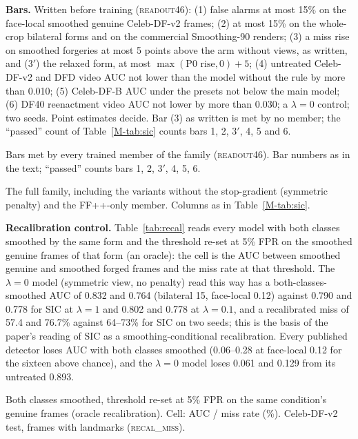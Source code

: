 \documentclass[10pt]{article}
\begin{document}
\textbf{Bars.} Written before training (\textsc{readout46}): (1) false alarms at most 15\% on the
face-local smoothed genuine Celeb-DF-v2 frames; (2) at most 15\% on the whole-crop bilateral forms and on the commercial
Smoothing-90 renders; (3) a miss rise on smoothed forgeries at most 5 points above the arm without views, as written, and
(3$'$) the relaxed form, at most $\max(\text{P0 rise},0)+5$; (4) untreated Celeb-DF-v2 and DFD video AUC not lower than the
model without the rule by more than 0.010; (5) Celeb-DF-B AUC under the presets not below the main model; (6) DF40 reenactment
video AUC not lower by more than 0.030; a $\lambda=0$ control; two seeds. Point estimates decide. Bar (3) as written is met by
no member; the ``passed'' count of Table~\ref{M-tab:sic} counts bars 1, 2, 3$'$, 4, 5 and 6.
\begin{table}[H]
\centering
\caption{Bars met by every trained member of the family (\textsc{readout46}). Bar numbers as in the text; ``passed'' counts bars 1,
2, 3$'$, 4, 5, 6.}
\label{tab:sicbars}
\scriptsize
\begin{adjustbox}{max width=\linewidth}\end{adjustbox}
\end{table}
\begin{table}[H]
\centering
\caption{The full family, including the variants without the stop-gradient (symmetric penalty) and the FF++-only member.
Columns as in Table~\ref{M-tab:sic}.}
\label{tab:sicfull}
\scriptsize
\begin{adjustbox}{max width=\linewidth}\end{adjustbox}
\end{table}

\textbf{Recalibration control.} Table~\ref{tab:recal} reads every model with both classes smoothed by the same form and the
threshold re-set at 5\% FPR on the smoothed genuine frames of that form (an oracle): the cell is the AUC between smoothed
genuine and smoothed forged frames and the miss rate at that threshold. The $\lambda=0$ model (symmetric view, no penalty)
read this way has a both-classes-smoothed AUC of 0.832 and 0.764 (bilateral 15, face-local 0.12) against 0.790 and 0.778 for
SIC at $\lambda=1$ and 0.802 and 0.778 at $\lambda=0.1$, and a recalibrated miss of 57.4 and 76.7\% against 64--73\% for SIC on
two seeds; this is the basis of the paper's reading of SIC as a smoothing-conditional recalibration. Every published detector
loses AUC with both classes smoothed (0.06--0.28 at face-local 0.12 for the sixteen above chance), and the $\lambda=0$ model
loses 0.061 and 0.129 from its untreated 0.893.
\begin{table}[H]
\centering
\caption{Both classes smoothed, threshold re-set at 5\% FPR on the same condition's genuine frames (oracle recalibration). Cell:
AUC / miss rate (\%). Celeb-DF-v2 test, frames with landmarks (\textsc{recal\_miss}).}
\label{tab:recal}
\scriptsize
\begin{adjustbox}{max width=\linewidth}\end{adjustbox}
\end{table}
\end{document}
